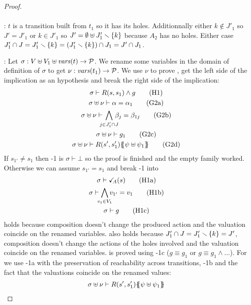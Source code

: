 \documentclass{article}
\begin{document}
\begin{proof}
\begin{gather}
	\end{gather}
\item[\goal{0'}:] \(t\) is a transition built from \(t_1\) so it has its holes.
	Additionnally either \(k \notin J'_1\) so \(J' = J'_1\) or \(k \in J'_1\) so \(J' = \emptyset \uplus J'_1 \smallsetminus {\left\{k\right\}}\) because \(A_2\) has no holes.
	Either case \(J'_1 \cap J = J'_1 \smallsetminus {\left\{k\right\}} = {\left(J'_1 \smallsetminus {\left\{k\right\}}\right)} \cap J_1 = J' \cap J_1\).
\item[\goal{2}:] Let \(\sigma: V \uplus V_1 \uplus \mathit{vars}{\left(t\right)} \to \mathcal{P}\).
	We rename some variables in the domain of definition of \(\sigma\) to get \(\nu: \mathit{vars}{\left(t_1\right)} \to \mathcal{P}\).
	We use \(\nu\) to prove , get the left side of the implication as an hypothesis and break the right side of the implication:
	\begin{gather}
		\sigma \vdash R\mpar{s, s_1} \wedge g \hyp{1} \\
		\sigma \uplus \nu \vdash \alpha = \alpha_1 \goal{2a} \\
		\sigma \uplus \nu \vdash \bigwedge_\subbox{j \in J'_1 \cap J} \beta_j = \beta_{1j} \goal{2b} \\
		\sigma \uplus \nu \vdash g_1 \goal{2c} \\
		\sigma \uplus \nu \vdash R\mpar{s', s'_1}\psubst{\psi \uplus \psi_1} \goal{2d}
	\end{gather}
	If \(s_{1'} \neq s_1\) then \hyp{1} is \(\sigma \vdash \bot\) so the proof is finished and the empty family worked.
	Otherwise we can assume \(s_{1'} = s_1\) and break \hyp{1} into
	\begin{gather}
		\sigma \vdash \reach{A}\mpar{s} \hyp{1a} \\
		\sigma \vdash \bigwedge_\subbox{v_1 \in V_1} v_{1'} = v_1 \hyp{1b} \\
		\sigma \vdash g \hyp{1c}
	\end{gather}
	 holds because composition doesn't change the produced action and the valuation coincide on the renamed variables.
	 also holds because \(J'_1 \cap J = J'_1 \smallsetminus {\left\{k\right\}} = J'\), composition doesn't change the actions of the holes involved and the valuation coincide on the renamed variables.
	 is proved using \hyp{1c} (\(g \equiv g_1\) or \(g \equiv g_1 \wedge \dots\)).
	For  we use \hyp{1a} with the preservation of reachability across transitions, \hyp{1b} and the fact that the valuations coincide on the renamed values:
	\begin{align*}
		& \sigma \uplus \nu \vdash R\mpar{s', s'_1}\psubst{\psi \uplus \psi_1} \\

\end{align*}
\end{proof}
\end{document}
